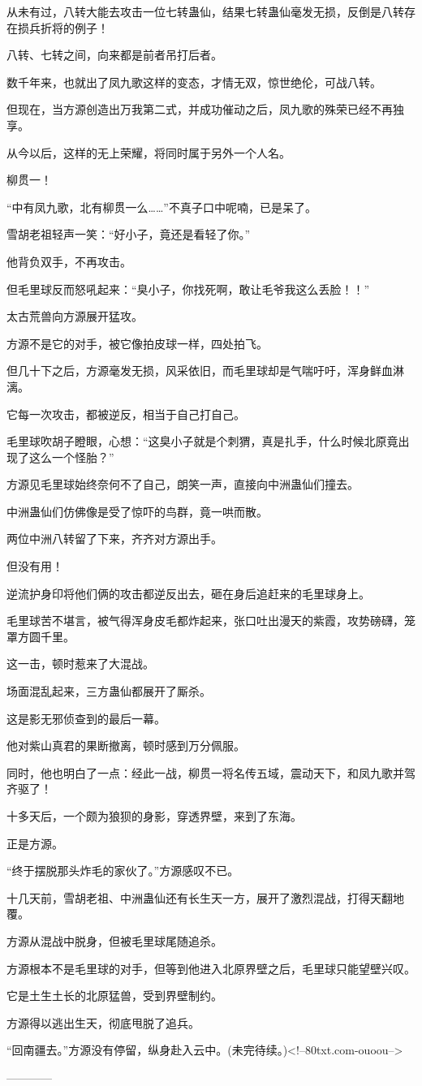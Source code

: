 \begin{this_body}
从未有过，八转大能去攻击一位七转蛊仙，结果七转蛊仙毫发无损，反倒是八转存在损兵折将的例子！

八转、七转之间，向来都是前者吊打后者。

数千年来，也就出了凤九歌这样的变态，才情无双，惊世绝伦，可战八转。

但现在，当方源创造出万我第二式，并成功催动之后，凤九歌的殊荣已经不再独享。

从今以后，这样的无上荣耀，将同时属于另外一个人名。

柳贯一！

“中有凤九歌，北有柳贯一么……”不真子口中呢喃，已是呆了。

雪胡老祖轻声一笑：“好小子，竟还是看轻了你。”

他背负双手，不再攻击。

但毛里球反而怒吼起来：“臭小子，你找死啊，敢让毛爷我这么丢脸！！”

太古荒兽向方源展开猛攻。

方源不是它的对手，被它像拍皮球一样，四处拍飞。

但几十下之后，方源毫发无损，风采依旧，而毛里球却是气喘吁吁，浑身鲜血淋漓。

它每一次攻击，都被逆反，相当于自己打自己。

毛里球吹胡子瞪眼，心想：“这臭小子就是个刺猬，真是扎手，什么时候北原竟出现了这么一个怪胎？”

方源见毛里球始终奈何不了自己，朗笑一声，直接向中洲蛊仙们撞去。

中洲蛊仙们仿佛像是受了惊吓的鸟群，竟一哄而散。

两位中洲八转留了下来，齐齐对方源出手。

但没有用！

逆流护身印将他们俩的攻击都逆反出去，砸在身后追赶来的毛里球身上。

毛里球苦不堪言，被气得浑身皮毛都炸起来，张口吐出漫天的紫霞，攻势磅礴，笼罩方圆千里。

这一击，顿时惹来了大混战。

场面混乱起来，三方蛊仙都展开了厮杀。

这是影无邪侦查到的最后一幕。

他对紫山真君的果断撤离，顿时感到万分佩服。

同时，他也明白了一点：经此一战，柳贯一将名传五域，震动天下，和凤九歌并驾齐驱了！

十多天后，一个颇为狼狈的身影，穿透界壁，来到了东海。

正是方源。

“终于摆脱那头炸毛的家伙了。”方源感叹不已。

十几天前，雪胡老祖、中洲蛊仙还有长生天一方，展开了激烈混战，打得天翻地覆。

方源从混战中脱身，但被毛里球尾随追杀。

方源根本不是毛里球的对手，但等到他进入北原界壁之后，毛里球只能望壁兴叹。

它是土生土长的北原猛兽，受到界壁制约。

方源得以逃出生天，彻底甩脱了追兵。

“回南疆去。”方源没有停留，纵身赴入云中。(未完待续。)<!--80txt.com-ouoou-->

------------

\end{this_body}

